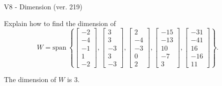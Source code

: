 \begin{exercise}
  \begin{exerciseTitle}V8 - Dimension (ver. 219)\end{exerciseTitle}
  \begin{exerciseStatement}
    Explain how to find the dimension of 
\[W=\mathrm{span}\ \left\{\left[\begin{array}{r}
-2 \\
-4 \\
-1 \\
1 \\
-2
\end{array}\right] , \left[\begin{array}{r}
3 \\
3 \\
-3 \\
3 \\
-3
\end{array}\right] , \left[\begin{array}{r}
2 \\
-4 \\
-3 \\
0 \\
2
\end{array}\right] , \left[\begin{array}{r}
-15 \\
-13 \\
10 \\
-7 \\
3
\end{array}\right] , \left[\begin{array}{r}
-31 \\
-41 \\
16 \\
-16 \\
11
\end{array}\right]\right\}.\]



  \end{exerciseStatement}
  \begin{exerciseAnswer}
   The dimension of \(W\) is  \(3\).
  


  \end{exerciseAnswer}
\end{exercise}